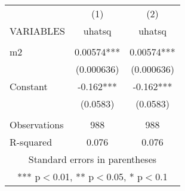 \documentclass[]{article}
\begin{document}
\begin{tabular}{lcc} \hline
 & (1) & (2) \\
VARIABLES & uhatsq & uhatsq \\ \hline
 &  &  \\
m2 & 0.00574*** & 0.00574*** \\
 & (0.000636) & (0.000636) \\
Constant & -0.162*** & -0.162*** \\
 & (0.0583) & (0.0583) \\
 &  &  \\
Observations & 988 & 988 \\
 R-squared & 0.076 & 0.076 \\ \hline
\multicolumn{3}{c}{ Standard errors in parentheses} \\
\multicolumn{3}{c}{ *** p$<$0.01, ** p$<$0.05, * p$<$0.1} \\
\end{tabular}
\end{document}

